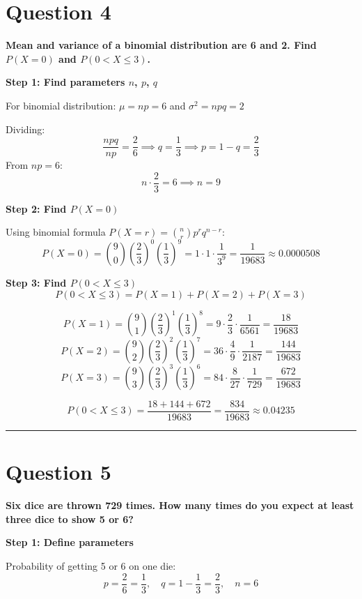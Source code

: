 \documentclass[12pt,a4paper]{article}
\begin{document}
\section{Question 4}
\textbf{Mean and variance of a binomial distribution are 6 and 2. Find $P(X=0)$ and $P(0 < X \leq 3)$.}

\textbf{Step 1: Find parameters $n$, $p$, $q$}

For binomial distribution: $\mu = np = 6$ and $\sigma^2 = npq = 2$

Dividing:
\[
\frac{npq}{np} = \frac{2}{6} \implies q = \frac{1}{3} \implies p = 1 - q = \frac{2}{3}
\]
From $np = 6$:
\[
n \cdot \frac{2}{3} = 6 \implies n = 9
\]

\textbf{Step 2: Find $P(X = 0)$}

Using binomial formula $P(X=r) = \binom{n}{r} p^r q^{n-r}$:
\[
P(X=0) = \binom{9}{0}\left(\frac{2}{3}\right)^0\left(\frac{1}{3}\right)^9 = 1\cdot1\cdot\frac{1}{3^9} = \frac{1}{19683} \approx \boxed{0.0000508}
\]

\textbf{Step 3: Find $P(0 < X \leq 3)$}
\[
P(0 < X \leq 3) = P(X=1) + P(X=2) + P(X=3)
\]

\[
P(X=1) = \binom{9}{1}\left(\frac{2}{3}\right)^1\left(\frac{1}{3}\right)^8 = 9\cdot\frac{2}{3}\cdot\frac{1}{6561} = \frac{18}{19683}
\]
\[
P(X=2) = \binom{9}{2}\left(\frac{2}{3}\right)^2\left(\frac{1}{3}\right)^7 = 36\cdot\frac{4}{9}\cdot\frac{1}{2187} = \frac{144}{19683}
\]
\[
P(X=3) = \binom{9}{3}\left(\frac{2}{3}\right)^3\left(\frac{1}{3}\right)^6 = 84\cdot\frac{8}{27}\cdot\frac{1}{729} = \frac{672}{19683}
\]

\[
P(0 < X \leq 3) = \frac{18 + 144 + 672}{19683} = \frac{834}{19683} \approx \boxed{0.04235}
\]

\vspace{1em}\hrule\vspace{1em}

\section{Question 5}
\textbf{Six dice are thrown 729 times. How many times do you expect at least three dice to show 5 or 6?}

\textbf{Step 1: Define parameters}

Probability of getting 5 or 6 on one die:
\[
p = \frac{2}{6} = \frac{1}{3}, \quad q = 1 - \frac{1}{3} = \frac{2}{3}, \quad n = 6
\]
\end{document}
